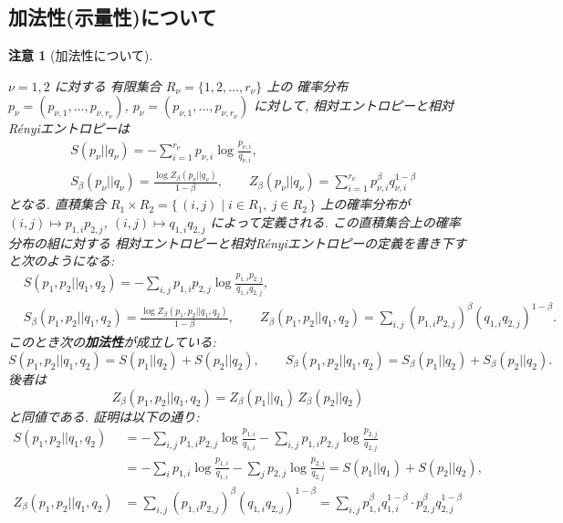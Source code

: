 \documentclass[12pt,twoside]{jarticle}
\theoremstyle{jplain}
\theoremstyle{jplain}
\theoremstyle{jplain}
\newtheorem{remark}[theorem]{注意}
\numberwithin{theorem}{section}
\numberwithin{equation}{section}
\numberwithin{figure}{section}
\numberwithin{table}{section}
\begin{document}

\subsection{加法性(示量性)について}

\begin{remark}[加法性について]
\label{remark:additivity}

$\nu=1,2$ に対する
有限集合 $R_\nu=\{1,2,\ldots,r_\nu\}$ 上の
確率分布 $p_\nu=(p_{\nu,1},\ldots,p_{\nu,r_\nu})$, 
$p_\nu=(p_{\nu,1},\ldots,p_{\nu,r_\nu})$ に対して,
相対エントロピーと相対R\'enyiエントロピーは
\begin{align*}
&
S(p_\nu||q_\nu) = -\sum_{i=1}^{r_\nu} p_{\nu,i}\log\frac{p_{\nu,i}}{q_{\nu,i}},
\\ &
S_\beta(p_\nu||q_\nu) = \frac{\log Z_\beta(p_\nu||q_\nu)}{1-\beta},
\qquad
Z_\beta(p_\nu||q_\nu) = \sum_{i=1}^{r_\nu} p_{\nu,i}^\beta q_{\nu,i}^{1-\beta}
\end{align*}
となる. 
直積集合 $R_1\times R_2=\{\,(i,j)\mid i\in R_1,\ j\in R_2\,\}$ 上の確率分布が
$(i,j)\mapsto p_{1,i}p_{2,j}$,  
$(i,j)\mapsto q_{1,i}q_{2,j}$
によって定義される. この直積集合上の確率分布の組に対する
相対エントロピーと相対R\'enyiエントロピーの定義を書き下すと次のようになる:
\begin{align*}
&
S(p_1,p_2||q_1,q_2) 
= -\sum_{i,j} p_{1,i}p_{2,j}\log\frac{p_{1,i}p_{2,j}}{q_{1,i}q_{2,j}},
\\ &
S_\beta(p_1,p_2||q_1,q_2) = \frac{\log Z_\beta(p_1,p_2||q_1,q_2)}{1-\beta},
\qquad
Z_\beta(p_1,p_2||q_1,q_2) = \sum_{i,j} (p_{1,i}p_{2,j})^\beta (q_{1,i}q_{2,j})^{1-\beta}.
\end{align*}
このとき次の{\bf 加法性}が成立している:
\[
S(p_1,p_2||q_1,q_2) = S(p_1||q_2) + S(p_2||q_2), \qquad
S_\beta(p_1,p_2||q_1,q_2) = S_\beta(p_1||q_2) + S_\beta(p_2||q_2).
\]
後者は
\[
Z_\beta(p_1,p_2||q_1,q_2)
= Z_\beta(p_1||q_1)\, Z_\beta(p_2||q_2)
\]
と同値である. 証明は以下の通り:
\begin{align*}
S(p_1,p_2||q_1,q_2)
&
=
-\sum_{i,j}p_{1,i}p_{2,j}\log\frac{p_{1,i}}{q_{1,i}}
-\sum_{i,j}p_{1,i}p_{2,j}\log\frac{p_{2,j}}{q_{2,j}}
\\ &
=
-\sum_{i}p_{1,i}\log\frac{p_{1,i}}{q_{1,i}}
-\sum_{j}p_{2,j}\log\frac{p_{2,j}}{q_{2,j}}
= S(p_1||q_1) + S(p_2||q_2),
\\
Z_\beta(p_1,p_2||q_1,q_2)
&
= \sum_{i,j} (p_{1,i}p_{2,j})^\beta (q_{1,i}q_{2,j})^{1-\beta}
= \sum_{i,j} p_{1,i}^\beta q_{1,i}^{1-\beta}\cdot p_{2,j}^\beta q_{2,j}^{1-\beta}

\end{align*}
\end{remark}
\end{document}
